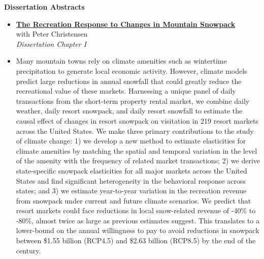\documentclass[11pt]{article}
\newenvironment{abstracts}[2]{%
  \begin{list}{}{%
    \setlength{\topsep}{0pt}%
    \setlength{\leftmargin}{#1}%
    \setlength{\rightmargin}{#2}%
    \setlength{\listparindent}{\parindent}%
    \setlength{\itemindent}{\parindent}%
    \setlength{\parsep}{\parskip}%
  }%
  \item[]}{\end{list}}
\begin{document}
\begin{abstracts}{-1.5in}{0in}

\begin{center}
    \textbf{Dissertation Abstracts}
\end{center}

{\small

\begin{itemize}
    
    \vfill
        
    \item[] \href{https://bryanparthum.s3.us-east-2.amazonaws.com/Parthum_Christensen_2019a.pdf}
    {\textbf{The Recreation Response to Changes in Mountain Snowpack}} \\
    with Peter Christensen \\
    \textit{Dissertation Chapter I}
    \item[] Many mountain towns rely on climate amenities such as wintertime precipitation to generate local economic activity. However, climate models predict large reductions in annual snowfall that could greatly reduce the recreational value of these markets. Harnessing a unique panel of daily transactions from the short-term property rental market, we combine daily weather, daily resort snowpack, and daily resort snowfall to estimate the causal effect of changes in resort snowpack on visitation in 219 resort markets across the United States. We make three primary contributions to the study of climate change: 1) we develop a new method to estimate elasticities for climate amenities by matching the spatial and temporal variation in the level of the amenity with the frequency of related market transactions; 2) we derive state-specific snowpack elasticities for all major markets across the United States and find significant heterogeneity in the behavioral response across states; and 3) we estimate year-to-year variation in the recreation revenue from snowpack under current and future climate scenarios. We predict that resort markets could face reductions in local snow-related revenue of -40\% to -80\%, almost twice as large as previous estimates suggest. This translates to a lower-bound on the annual willingness to pay to avoid reductions in snowpack between \$1.55 billion (RCP4.5) and \$2.63 billion (RCP8.5) by the end of the century.
    
    \vfill
    

\end{itemize}}
\end{abstracts}
\end{document}
